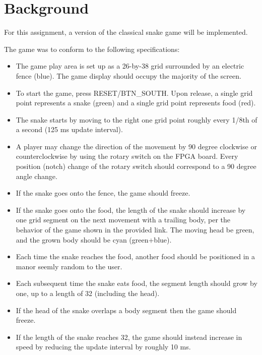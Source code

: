 \documentclass[paper=usletter, fontsize=12pt]{article}
\begin{document}
    \vspace{-0.1in}

    \section{Background}
    For this assignment, a version of the classical snake game will be implemented.

    The game was to conform to the following specifications:

    \begin{itemize}

        \item The game play area is set up as a 26-by-38 grid surrounded by an electric fence (blue). The game display should occupy the majority of the screen.

        \item To start the game, press RESET/BTN\_SOUTH. Upon release, a single grid point represents a snake (green) and a single grid point represents food (red).

        \item The snake starts by moving to the right one grid point roughly every 1/8th of a second (125 ms update interval).

        \item A player may change the direction of the movement by 90 degree clockwise or counterclockwise by using the rotary switch on the FPGA board. Every position (notch) change of the rotary switch should correspond to a 90 degree angle change.

        \item If the snake goes onto the fence, the game should freeze.

        \item If the snake goes onto the food, the length of the snake should increase by one grid segment on the next movement with a trailing body, per the behavior of the game shown in the provided link. The moving head be green, and the grown body should be cyan (green+blue).

        \item Each time the snake reaches the food, another food should be positioned in a manor seemly random to the user.

        \item Each subsequent time the snake eats food, the segment length should grow by one, up to a length of 32 (including the head).

        \item If the head of the snake overlaps a body segment then the game should freeze.

        \item If the length of the snake reaches 32, the game should instead increase in speed by reducing the update interval by roughly 10 ms.

    \end{itemize}
\end{document}
